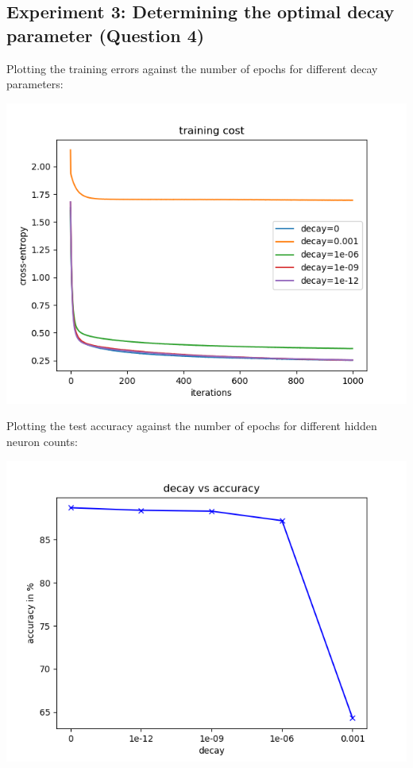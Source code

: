 \subsection*{Experiment 3: Determining the optimal decay parameter (Question 4)}

Plotting the training errors against the number of epochs for different decay
parameters:

\begin{center}
    \includegraphics[width=\imgw]{images/p1a4_decay_cost.png}   
\end{center}

Plotting the test accuracy against the number of epochs for different hidden
neuron counts:

\begin{center}
    \includegraphics[width=\imgw]{images/p1a4_decay_accuracy.png}   
\end{center}

